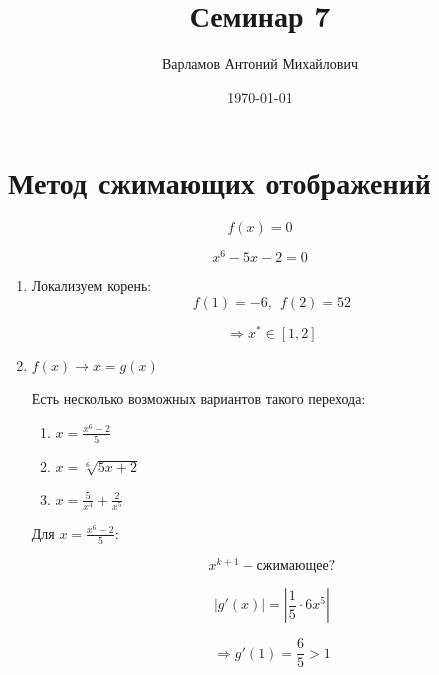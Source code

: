 \documentclass[10pt,a4paper]{article}
\title{Семинар 7}
\date{\today}
\author{Варламов Антоний Михайлович}
\begin{document}
	\maketitle
	
	\section{Метод сжимающих отображений}
	
	\begin{equation}
		f\left(x\right) = 0
	\end{equation}
	
	\begin{equation}
		x^{6} - 5x - 2 = 0
	\end{equation}
	
	\begin{enumerate}
		\item Локализуем корень:
			\begin{equation}
				f\left(1\right) = -6, \ \ f\left(2\right) = 52
			\end{equation}
			
			\begin{equation}
				\Rightarrow x^{*} \in \left[1, 2\right]
			\end{equation}
		\item $f\left(x\right) \rightarrow x = g\left(x\right)$
		
		Есть несколько возможных вариантов такого перехода:
		
		\begin{enumerate}
			\item $x = \frac{x^{6} - 2}{5}$
			\item $x = \sqrt[6]{5x + 2}$
			\item $x = \frac{5}{x^{4}} + \frac{2}{x^{5}}$
		\end{enumerate}
		
		Для $x = \frac{x^{6} - 2}{5}$:
		
		\begin{equation}
			x^{k + 1} - \text{сжимающее?}
		\end{equation}
		
		\begin{equation}
			\left|g'\left(x\right)\right| = \left|\frac{1}{5} \cdot 6x^{5}
			\right|
		\end{equation}
		
		\begin{equation}
			\Rightarrow g'\left(1\right) = \frac{6}{5} > 1
		\end{equation}
		

\end{enumerate}
\end{document}
